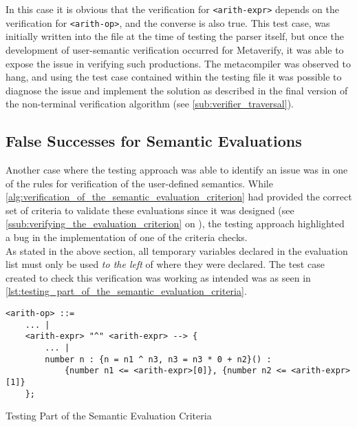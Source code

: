 In this case it is obvious that the verification for \texttt{<arith-expr>} depends on the verification for \texttt{<arith-op>}, and the converse is also true. 
This test case, was initially written into the file at the time of testing the parser itself, but once the development of user-semantic verification occurred for Metaverify, it was able to expose the issue in verifying such productions.
The metacompiler was observed to hang, and using the test case contained within the testing file it was possible to diagnose the issue and implement the solution as described in the final version of the non-terminal verification algorithm (see \autoref{sub:verifier_traversal}).


\subsection{False Successes for Semantic Evaluations} %
\label{sub:false_successes_for_semantic_evaluations}
Another case where the testing approach was able to identify an issue was in one of the rules for verification of the user-defined semantics. 
While \autoref{alg:verification_of_the_semantic_evaluation_criterion} had provided the correct set of criteria to validate these evaluations since it was designed (see \autoref{ssub:verifying_the_evaluation_criterion} on ), the testing approach highlighted a bug in the implementation of one of the criteria checks.\\

As stated in the above section, all temporary variables declared in the evaluation list must only be used \textit{to the left} of where they were declared. 
The test case created to check this verification was working as intended was as seen in \autoref{lst:testing_part_of_the_semantic_evaluation_criteria}.

\begin{listing}[!htb]
\begin{verbatim}
<arith-op> ::= 
    ... |
    <arith-expr> "^" <arith-expr> --> {
        ... |
        number n : {n = n1 ^ n3, n3 = n3 * 0 + n2}() :
            {number n1 <= <arith-expr>[0]}, {number n2 <= <arith-expr>[1]}
    };
\end{verbatim}
\caption{Testing Part of the Semantic Evaluation Criteria}
\label{lst:testing_part_of_the_semantic_evaluation_criteria}
\end{listing}

